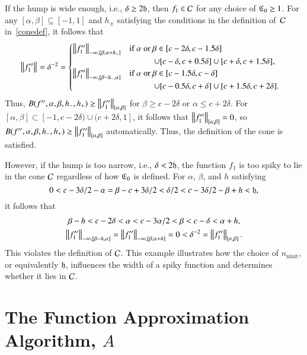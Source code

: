 \documentclass[review]{elsarticle}
\theoremstyle{definition}
\DeclareMathOperator{\ninit}{ninit}
\begin{document}
If the hump is wide enough, i.e., $\delta \ge 2 \fh$, then $f_1 \in \cc$ for any
choice of $\fC_0 \ge 1$. For any $[\alpha,\beta]\subseteq [-1,1]$ and
$h_{\pm}$ satisfying the conditions in the definition of~$\cc$ in~\eqref{conedef},
it follows that
\begin{align*}
    & \norm{f''_1} = \delta^{-2} =
\begin{cases}
\norm[-\infty,{[\beta,\alpha+h_+]}]{f''_1}  %
   & \text{if } \alpha\text{ or } \beta \in [c - 2\delta,  c - 1.5\delta]
\\ & \qquad\quad \cup [c - \delta,  c + 0.5\delta] \cup [c + \delta, c+1.5\delta],
\\ \norm[-\infty,{[\beta - h_-,\alpha]}]{f''_1} %
   & \text{if } \alpha\text{ or } \beta \in [c - 1.5\delta,  c - \delta]
\\ & \qquad\quad  \cup [c - 0.5 \delta,  c + \delta] \cup [c + 1.5\delta, c+2\delta].
\end{cases}
\end{align*}
Thus, $B(f'',\alpha,\beta,h_-,h_+)\ge\norm[{[\alpha,\beta]}]{f''_1}$ for $\beta
\ge c - 2\delta$ or $\alpha \le c + 2\delta$.
For $[\alpha,\beta] \subset [-1,c
- 2\delta) \cup (c+2\delta, 1]$, it follows that $\norm[{[\alpha,\beta]}]{f''_1} =
0$, so $B(f'',\alpha,\beta,h_-,h_+)\ge\norm[{[\alpha,\beta]}]{f''_1}$
automatically. Thus, the definition of the cone is satisfied.

However, if the hump is too narrow, i.e., $\delta < 2 \fh$, the function $f_1$
is too spiky to lie in the cone $\cc$ regardless of how $\fC_0$ is defined. For
$\alpha$, $\beta$, and $h$ satisfying
\[
0 < c - 3\delta/2 -\alpha =  \beta - c+ 3\delta/2 < \delta/2 < c-3\delta/2 - \beta + h < \fh,
\]
it follows that
\begin{gather*}
   \beta -  h < c - 2 \delta < \alpha < c - 3\alpha/2 < \beta < c - \delta < \alpha + h,
\\ \norm[-\infty,{[\beta - h,\alpha]}]{f''_1} =\norm[-\infty,{[\beta,\alpha+h]}]{f''_1}=0
< \delta^{-2} =\norm[{[\alpha,\beta]}]{f''_1}.
\end{gather*}
This violates the definition of $\cc$. This example illustrates how the choice
of $n_{\ninit}$, or equivalently $\fh$, influences the width of a spiky function and
determines whether it lies in $\cc$.


\section{The Function Approximation Algorithm, $A$}\label{sec:fappx}
\end{document}
